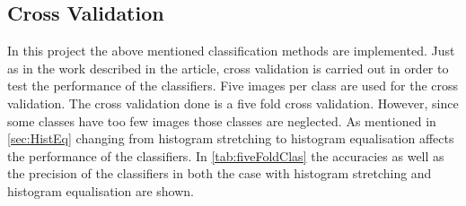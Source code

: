 \subsection{Cross Validation}
In this project the above mentioned classification methods are implemented. Just as in the work described in the article, cross validation is carried out in order to test the performance of the classifiers. Five images per class are used for the cross validation. The cross validation done is a five fold cross validation. However, since some classes have too few images those classes are neglected. As mentioned in \autoref{sec:HistEq} changing from histogram stretching to histogram equalisation affects the performance of the classifiers. In \autoref{tab:fiveFoldClas} the accuracies as well as the precision of the classifiers in both the case with histogram stretching and histogram equalisation are shown.  

